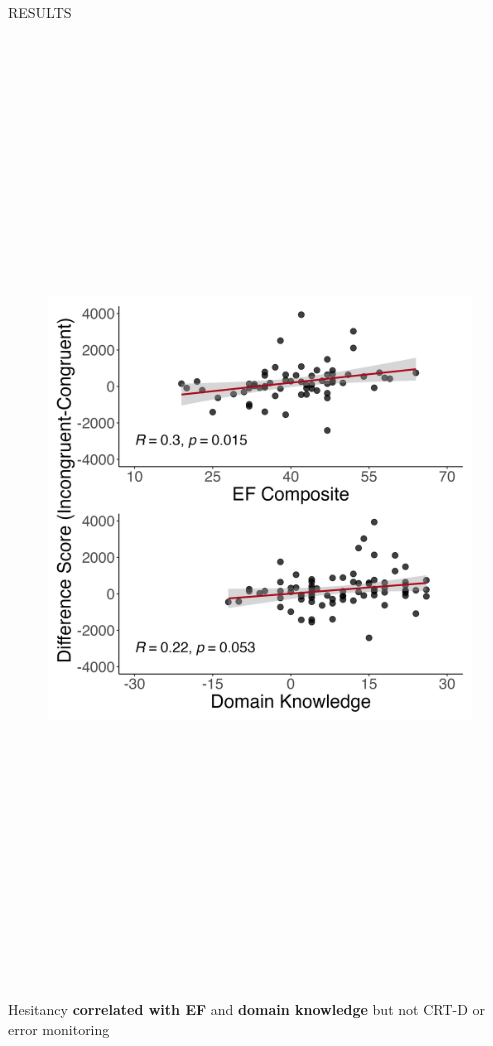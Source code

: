 \documentclass[final]{beamer}
\newlength{\colwidth}
\newlength{\widecolwidth}
\begin{document}
\begin{frame}[t]
\begin{columns}[t]
\begin{column}{\widecolwidth}
\begin{block}{RESULTS}
\begin{minipage}{0.5\textwidth}
\end{minipage}%
\begin{minipage}{0.5\textwidth}
\centering
    \begin{figure}
      \includegraphics[height=25cm]{plots/mergedfigure.png}
    \end{figure}
    Hesitancy \textbf{correlated with EF} and \textbf{domain knowledge} but not CRT-D or error monitoring
\end{minipage}
\end{block}
    

\end{column}
\end{columns}
\end{frame}
\end{document}
